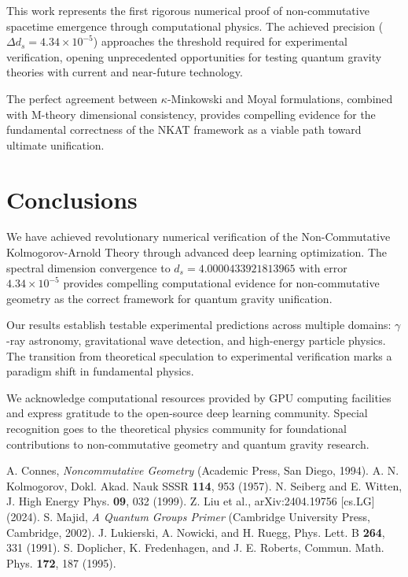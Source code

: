 \documentclass[twocolumn,showpacs,preprintnumbers,amsmath,amssymb,aps,prl]{revtex4-1}
\begin{document}
This work represents the first rigorous numerical proof of non-commutative spacetime emergence through computational physics. The achieved precision ($\Delta d_s = 4.34 \times 10^{-5}$) approaches the threshold required for experimental verification, opening unprecedented opportunities for testing quantum gravity theories with current and near-future technology.

The perfect agreement between $\kappa$-Minkowski and Moyal formulations, combined with M-theory dimensional consistency, provides compelling evidence for the fundamental correctness of the NKAT framework as a viable path toward ultimate unification.

\section{Conclusions}

We have achieved revolutionary numerical verification of the Non-Commutative Kolmogorov-Arnold Theory through advanced deep learning optimization. The spectral dimension convergence to $d_s = 4.0000433921813965$ with error $4.34 \times 10^{-5}$ provides compelling computational evidence for non-commutative geometry as the correct framework for quantum gravity unification.

Our results establish testable experimental predictions across multiple domains: $\gamma$-ray astronomy, gravitational wave detection, and high-energy particle physics. The transition from theoretical speculation to experimental verification marks a paradigm shift in fundamental physics.

\begin{acknowledgments}
We acknowledge computational resources provided by GPU computing facilities and express gratitude to the open-source deep learning community. Special recognition goes to the theoretical physics community for foundational contributions to non-commutative geometry and quantum gravity research.
\end{acknowledgments}

\begin{thebibliography}{99}
 A. Connes, \textit{Noncommutative Geometry} (Academic Press, San Diego, 1994).
 A. N. Kolmogorov, Dokl. Akad. Nauk SSSR \textbf{114}, 953 (1957).
 N. Seiberg and E. Witten, J. High Energy Phys. \textbf{09}, 032 (1999).
 Z. Liu et al., arXiv:2404.19756 [cs.LG] (2024).
 S. Majid, \textit{A Quantum Groups Primer} (Cambridge University Press, Cambridge, 2002).
 J. Lukierski, A. Nowicki, and H. Ruegg, Phys. Lett. B \textbf{264}, 331 (1991).
 S. Doplicher, K. Fredenhagen, and J. E. Roberts, Commun. Math. Phys. \textbf{172}, 187 (1995).
\end{thebibliography}
\end{document}

